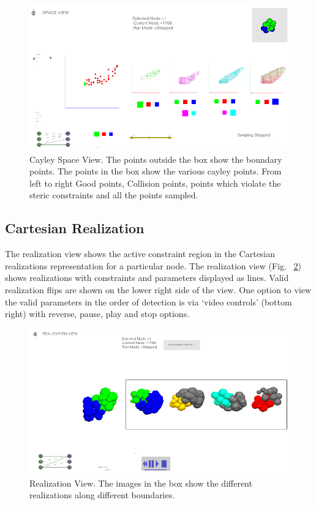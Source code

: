 \documentclass[10pt]{article}
\begin{document}
\begin{figure}[h]
\centering
\includegraphics[width=\textwidth] {fig/CayleySpaceView.png}
\caption{Cayley Space View. The points outside the box show the boundary
points. The points in the box show the various cayley points. From left to
right Good points, Collision points, points which violate the steric
constraints and all the points sampled.}
\label{SpaceView}
\end{figure}


\subsection{Cartesian Realization}
The realization view shows the active constraint region in the Cartesian
realizations representation for a particular node. The realization view 
(Fig. ~\ref{RealizationView}) shows realizations with
constraints and parameters displayed as lines. Valid realization flips are
shown on the lower right side of the view.  One option to view the valid
parameters in the order of detection is via ‘video controls’ (bottom right)
with reverse, pause, play and stop options.


\begin{figure}[h]
		\centering
		\includegraphics[width=\textwidth] {fig/RealizationView.png}
		\caption{Realization View. The images in the box show the different
		realizations along different boundaries.}
		\label{RealizationView}
\end{figure}
\end{document}
